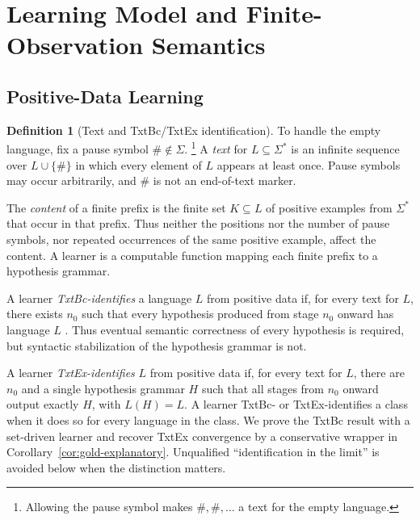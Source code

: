 \documentclass[11pt,a4paper]{article}
\numberwithin{equation}{section}
\theoremstyle{plain}
\theoremstyle{definition}
\newtheorem{definition}[theorem]{Definition}
\theoremstyle{remark}
\begin{document}
\section{Learning Model and Finite-Observation Semantics}
\label{sec:prelim}

\subsection{Positive-Data Learning}

\begin{definition}[Text and TxtBc/TxtEx identification]
To handle the empty language, fix a pause symbol
\(\#\notin\Sigma\).%
\footnote{Allowing the pause symbol makes
\(\#,\#,\ldots\) a text for the empty language.}
A \emph{text} for \(L\subseteq\Sigma^*\) is an infinite sequence over
\(L\cup\{\#\}\) in which every element of \(L\) appears at least once.
Pause symbols may occur arbitrarily, and \(\#\) is not an end-of-text marker.

The \emph{content} of a finite prefix is the finite set
\(K\subseteq L\) of positive examples from \(\Sigma^*\) that occur in that
prefix.  Thus neither the positions nor the number of pause symbols, nor repeated
occurrences of the same positive example, affect the content.
A learner is a computable function mapping each finite prefix to a hypothesis
grammar.

A learner \emph{TxtBc-identifies} a language \(L\) from positive data if,
for every text for \(L\), there exists \(n_0\) such that every hypothesis
produced from stage \(n_0\) onward has language \(L\)
\cite{CaseLynes1982,CaseSmith1983}.  Thus eventual semantic correctness of
every hypothesis is required, but syntactic stabilization of the hypothesis
grammar is not.

A learner \emph{TxtEx-identifies} \(L\) from positive data if, for every text
for \(L\), there are \(n_0\) and a single hypothesis grammar \(H\) such that
all stages from \(n_0\) onward output exactly \(H\), with \(L(H)=L\).  A
learner TxtBc- or TxtEx-identifies a class when it does so for every language
in the class.  We prove the TxtBc result with a set-driven learner and recover
TxtEx convergence by a conservative wrapper in
Corollary~\ref{cor:gold-explanatory}.  Unqualified ``identification in the
limit'' is avoided below when the distinction matters.
\end{definition}
\end{document}
